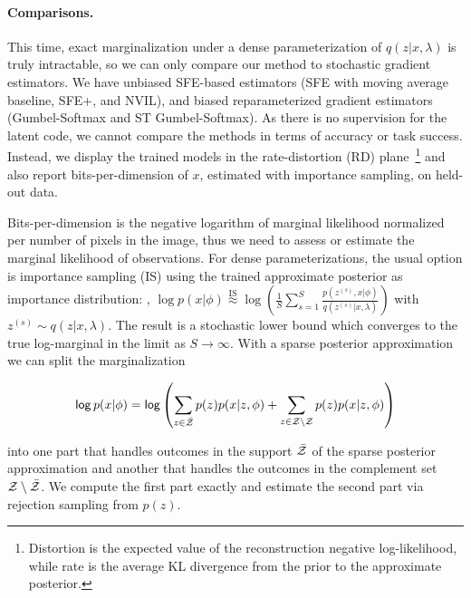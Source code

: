 \begin{sloppypar}
    \paragraph*{Comparisons.} This time, exact marginalization under a
    dense parameterization of $q (z | x, \lambda)$ is truly intractable,
    so we can only compare our method to stochastic gradient estimators.
    We have unbiased SFE-based estimators (SFE with moving average
    baseline, SFE+, and NVIL), and biased reparameterized gradient
    estimators (Gumbel-Softmax and ST Gumbel-Softmax). As there is no
    supervision for the latent code, we cannot compare the methods in
    terms of accuracy or task success. Instead, we display the trained
    models in the rate-distortion (RD)
    plane~\citep{Alemi2018}\footnote{Distortion is the expected value of
        the reconstruction negative log-likelihood, while rate is the average
        KL divergence from the prior to the approximate posterior.} and also
    report bits-per-dimension of $x$, estimated with importance sampling,
    on held-out data.
\end{sloppypar}

\begin{sloppypar}
    Bits-per-dimension is the negative logarithm of marginal likelihood
    normalized per number of pixels in the image, thus we need to assess
    or estimate the marginal likelihood of observations. For dense
    parameterizations, the usual option is importance sampling (IS) using
    the trained approximate posterior as importance distribution: \ie,
    $\log p(x|\phi) \overset{\text{IS}}{\approx} \log \left(\frac{1}{S}
        \sum_{s=1}^S \frac{p(z^{(s)}, x|\phi)}{q(z^{(s)} | x, \lambda)}
        \right)$ with $z^{(s)} \sim q(z|x, \lambda)$. The result is a
    stochastic lower bound which converges to the true log-marginal in
    the limit as $S \to \infty$. With a sparse posterior approximation we
    can split the marginalization
\end{sloppypar}

\begin{equation}
    \operatorname*{\mathsf{log}} p(x|\phi) = \operatorname*{\mathsf{log}} \left( \sum_{z \in \bar {\mathcal{Z}}}
    p(z)p(x|z, \phi) + \sum_{z \in \mathcal{Z} \setminus \mathcal{Z}} p(z)p(x|z, \phi)
    \right)
\end{equation}

\noindent into one part that handles outcomes in the support $\bar {\mathcal{Z}}$ of the
sparse posterior approximation and another that handles the
outcomes in the complement set $\mathcal{Z} \setminus \bar {\mathcal{Z}}$. We compute
the first part exactly and estimate the second part via rejection
sampling from $p(z)$.

